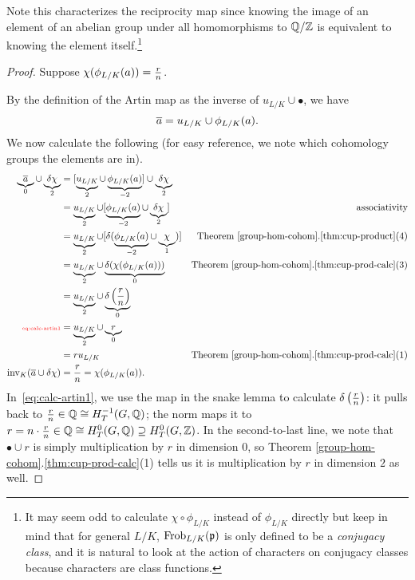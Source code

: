 Note this characterizes the reciprocity map since knowing the image of an element of an abelian group under all homomorphisms to $\mathbb{Q}/\mathbb{Z}$ is equivalent to knowing the element itself.\footnote{It may seem odd to calculate $\chi\circ \phi_{L/K}$ instead of $\phi_{L/K}$ directly but keep in mind that for general $L/K$, $\operatorname{Frob}_{L/K}(\mathfrak{p})$ is only defined to be a {\it conjugacy class}, and it is natural to look at the action of characters on conjugacy classes because characters are class functions.}
\begin{proof}
Suppose $\chi(\phi_{L/K}(a))=\frac{r}{n}$.

By the definition of the Artin map as the inverse of $u_{L/K}\cup \bullet$, we have
\[
\overline{a}
=u_{L/K}\cup \phi_{L/K}(a).
\]
We now calculate the following (for easy reference, we note which cohomology groups the elements are in). 
\begin{align}
\underbrace{\ol a}_{0}\cup \underbrace{\de \chi}_{2}
&=[\underbrace{u_{L/K}}_{2} \cup\underbrace{\phi_{L/K}(a)}_{-2}]\cup \underbrace{\de \chi}_{2}\nonumber\\
\nonumber&=\underbrace{u_{L/K}}_{2} \cup[\underbrace{\phi_{L/K}(a)}_{-2}\cup \underbrace{\de \chi}_{2}]&\text{associativity}\\
\nonumber&=\underbrace{u_{L/K}}_{2} \cup[\de(\underbrace{\phi_{L/K}(a)}_{-2}\cup \underbrace{\chi}_{1})] \nonumber&\text{Theorem~\ref{group-hom-cohom}.\ref{thm:cup-product}(4)}\\
\nonumber&=\underbrace{u_{L/K}}_{2} \cup \underbrace{\de(\chi(\phi_{L/K}(a)))}_{0}&\text{Theorem \ref{group-hom-cohom}.\ref{thm:cup-prod-calc}(3)}\\
\nonumber&=\underbrace{u_{L/K}}_{2} \cup \underbrace{\de\pf rn}_{0}\\
\llabel{eq:calc-artin1}&=\underbrace{u_{L/K}}_2\cup \underbrace{r}_{0}\\
\nonumber
&=ru_{L/K}&\text{Theorem \ref{group-hom-cohom}.\ref{thm:cup-prod-calc}(1)}%
\\
\nonumber\inv_K(\ol a\cup \de \chi) &= \fc rn=\chi(\phi_{L/K}(a)).
\end{align}
In~\eqref{eq:calc-artin1}, we use the map in the snake lemma to calculate $\delta\left( {\frac{r}{n}} \right)$: it pulls back to $\frac{r}{n}\in \mathbb{Q}\cong H_T^{-1}(G,\mathbb{Q})$; the norm maps it to $r=n\cdot \frac{r}{n}\in \mathbb{Q}\cong H_T^{0}(G,\mathbb{Q})\supseteq H_T^{0}(G,\mathbb{Z})$. In the second-to-last line, %
we note that $\bullet \cup r$ is simply multiplication by $r$ in dimension 0, so Theorem \ref{group-hom-cohom}.\ref{thm:cup-prod-calc}(1) tells us it is multiplication by $r$ in dimension $2$ as well.
%
\end{proof}
